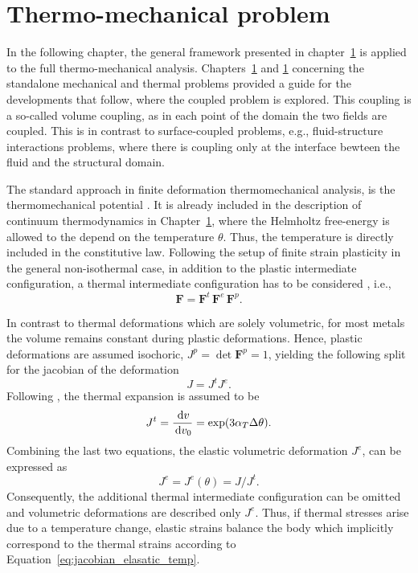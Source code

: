 \chapter{Thermo-mechanical problem}

In the following chapter, the general framework presented in chapter~\ref{} is applied to the full thermo-mechanical analysis.
Chapters~\ref{} and \ref{} concerning the standalone mechanical and thermal problems provided a guide for the developments that follow, where the coupled problem is explored.
This coupling is a so-called volume coupling, as in each point of the domain the two fields are coupled.
This is in contrast to surface-coupled problems, e.g., fluid-structure interactions problems, where there is coupling only at the interface bewteen the fluid and the structural domain.

The standard approach in finite deformation thermomechanical analysis, is the thermomechanical potential \cite{}.
It is already included in the description of continuum thermodynamics in Chapter~\ref{}, where the Helmholtz free-energy is allowed to the depend on the temperature \(\theta\).
Thus, the temperature is directly included in the constitutive law.
Following the setup of finite strain plasticity in the general non-isothermal case, in addition to the plastic intermediate configuration, a thermal intermediate configuration has to be considered \cite{}, i.e.,
\begin{equation}
  \bm F = \bm F^t\,\bm F^e\,\bm F^p.
\end{equation}

In contrast to thermal deformations which are solely volumetric, for most metals the volume remains constant during plastic deformations.
Hence, plastic deformations are assumed isochoric, \(J^p = \operatorname{det}\bm F^p=1\), yielding the following split for the jacobian of the deformation
\begin{equation}
  J = J^t J^e.
\end{equation}
Following \cite{danowski_computational_2014}, the thermal expansion is assumed to be
\begin{equation}
  J^t = \frac{\,\mathrm{d} v}{\,\mathrm{d} v_0} = \operatorname{exp}(3\alpha_T \Delta\theta).
\end{equation}
Combining the last two equations, the elastic volumetric deformation \(J^e\), can be expressed as
\begin{equation} \label{eq:jacobian_elasatic_temp}
  J^e  = J^e(\theta) = J/J^t.
\end{equation}
Consequently, the additional thermal intermediate configuration can be omitted and volumetric deformations are described only \(J^e\).
Thus, if thermal stresses arise due to a temperature change, elastic strains balance the body which implicitly correspond to the thermal strains according to Equation~\eqref{eq:jacobian_elasatic_temp}.

